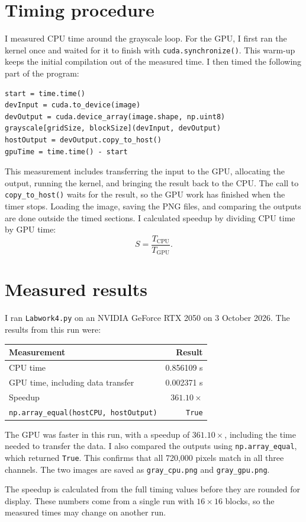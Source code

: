 \documentclass[11pt,a4paper]{article}
\begin{document}
\section{Timing procedure}
I measured CPU time around the grayscale loop. For the GPU, I first ran
the kernel once and waited for it to finish with
\texttt{cuda.synchronize()}. This warm-up keeps the initial compilation
out of the measured time. I then timed the following part of the program:
\begin{lstlisting}
start = time.time()
devInput = cuda.to_device(image)
devOutput = cuda.device_array(image.shape, np.uint8)
grayscale[gridSize, blockSize](devInput, devOutput)
hostOutput = devOutput.copy_to_host()
gpuTime = time.time() - start
\end{lstlisting}
This measurement includes transferring the input to the GPU, allocating
the output, running the kernel, and bringing the result back to the CPU.
The call to \texttt{copy\_to\_host()} waits for the result, so the GPU work
has finished when the timer stops. Loading the image, saving the PNG
files, and comparing the outputs are done outside the timed sections.
I calculated speedup by dividing CPU time by GPU time:
\[
S=\frac{T_{\mathrm{CPU}}}{T_{\mathrm{GPU}}}.
\]

\section{Measured results}
I ran \texttt{Labwork4.py} on an NVIDIA GeForce RTX 2050 on
3 October 2026. The results from this run were:
\begin{center}
\begin{tabular}{lr}
\toprule
Measurement & Result \\
\midrule
CPU time & 0.856109 s \\
GPU time, including data transfer & 0.002371 s \\
Speedup & $361.10\times$ \\
\texttt{np.array\_equal(hostCPU, hostOutput)} & \texttt{True} \\
\bottomrule
\end{tabular}
\end{center}

The GPU was faster in this run, with a speedup of $361.10\times$,
including the time needed to transfer the data. I also compared the
outputs using \texttt{np.array\_equal}, which returned \texttt{True}.
This confirms that all 720,000 pixels match in all three channels.
The two images are saved as \texttt{gray\_cpu.png} and
\texttt{gray\_gpu.png}.

The speedup is calculated from the full timing values before they are
rounded for display. These numbers come from a single run with
$16\times16$ blocks, so the measured times may change on another run.
\end{document}
